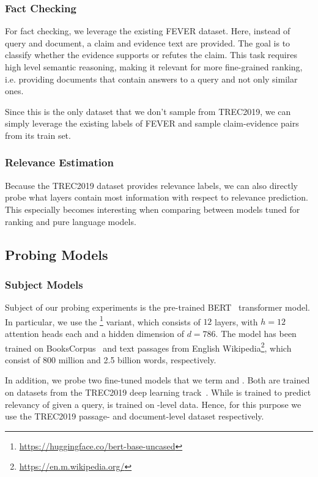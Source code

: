 \subsubsection{Fact Checking}
For fact checking, we leverage the existing FEVER \cite{thorne-etal-2018-fever} dataset. Here, instead of query and document, a claim and evidence text are provided. The goal is to classify whether the evidence supports or refutes the claim. This task requires high level semantic reasoning, making it relevant for more fine-grained ranking, i.e. providing documents that contain  answers to a query and not only similar ones.

Since this is the only dataset that we don't sample from TREC2019, we can simply leverage the existing labels of FEVER and sample claim-evidence pairs from its train set.

\subsubsection{Relevance Estimation}
Because the TREC2019 dataset provides relevance labels, we can also directly probe what layers contain most information with respect to relevance prediction. This especially becomes interesting when comparing between models tuned for ranking and pure language models.

\subsection{Probing Models}
\subsubsection{Subject Models}
\label{sec:subjects}
Subject of our probing experiments is the pre-trained BERT~\cite{devlin-etal-2019-bert} transformer model. In particular, we use the \footnote{\url{https://huggingface.co/bert-base-uncased}} variant, which consists of $12$ layers, with $h=12$ attention heads each and a hidden dimension of $d=786$. The model has been trained on BooksCorpus~\cite{7410368} and text passages from English Wikipedia\footnote{\url{https://en.m.wikipedia.org/}}, which consist of 800 million and 2.5 billion words, respectively.

In addition, we probe two fine-tuned  models that we term  and . Both are trained on datasets from the TREC2019 deep learning track~\cite{DBLP:journals/corr/abs-2003-07820}. While  is trained to predict relevancy of  given a query,  is trained on -level data. Hence, for this purpose we use the TREC2019 passage- and document-level dataset respectively.

